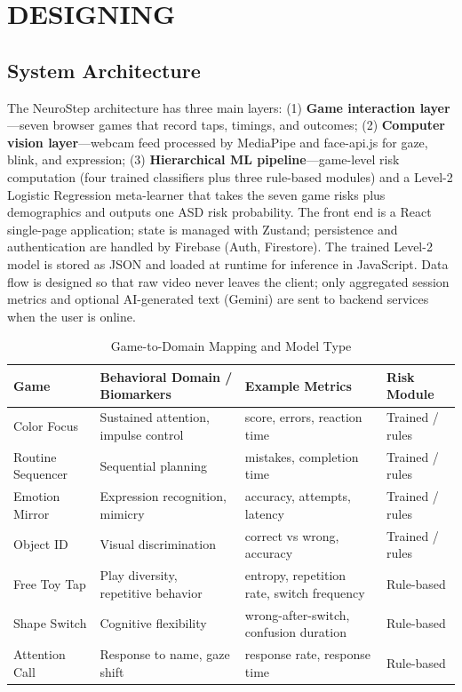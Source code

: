 \documentclass[12pt,a4paper]{report}
\begin{document}
\chapter{DESIGNING}
\section{System Architecture}
The NeuroStep architecture has three main layers: (1) \textbf{Game interaction layer}---seven browser games that record taps, timings, and outcomes; (2) \textbf{Computer vision layer}---webcam feed processed by MediaPipe and face-api.js for gaze, blink, and expression; (3) \textbf{Hierarchical ML pipeline}---game-level risk computation (four trained classifiers plus three rule-based modules) and a Level-2 Logistic Regression meta-learner that takes the seven game risks plus demographics and outputs one ASD risk probability. The front end is a React single-page application; state is managed with Zustand; persistence and authentication are handled by Firebase (Auth, Firestore). The trained Level-2 model is stored as JSON and loaded at runtime for inference in JavaScript. Data flow is designed so that raw video never leaves the client; only aggregated session metrics and optional AI-generated text (Gemini) are sent to backend services when the user is online.
\begin{table}[!htbp]
    \centering
    \caption{Game-to-Domain Mapping and Model Type}
    \renewcommand{\arraystretch}{1.35}
    \small
    \begin{tabular}{|p{2.9cm}|p{5.2cm}|p{2.8cm}|p{2.5cm}|}
        \hline
        \textbf{Game} & \textbf{Behavioral Domain / Biomarkers} & \textbf{Example Metrics} & \textbf{Risk Module} \\
        \hline
        Color Focus & Sustained attention, impulse control & score, errors, reaction time & Trained / rules \\
        \hline
        Routine Sequencer & Sequential planning & mistakes, completion time & Trained / rules \\
        \hline
        Emotion Mirror & Expression recognition, mimicry & accuracy, attempts, latency & Trained / rules \\
        \hline
        Object ID & Visual discrimination & correct vs wrong, accuracy & Trained / rules \\
        \hline
        Free Toy Tap & Play diversity, repetitive behavior & entropy, repetition rate, switch frequency & Rule-based \\
        \hline
        Shape Switch & Cognitive flexibility & wrong-after-switch, confusion duration & Rule-based \\
        \hline
        Attention Call & Response to name, gaze shift & response rate, response time & Rule-based \\
        \hline
    \end{tabular}
\end{table}
\end{document}
